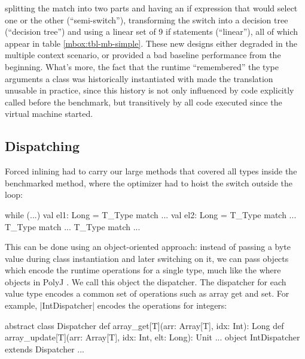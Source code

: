  splitting the match into two parts and having an if expression that would select one or the other (``semi-switch''), transforming the switch into a decision tree (``decision tree'') and using a linear set of 9 if statements (``linear''), all of which appear in table \ref{mbox:tbl-mb-simple}. These new designs either degraded in the multiple context scenario, or provided a bad baseline performance from the beginning. What's more, the fact that the runtime ``remembered'' the type arguments a class was historically instantiated with made the translation unusable in practice, since this history is not only influenced by code explicitly called before the benchmark, but transitively by all code executed since the virtual machine started. %

\subsection{Dispatching}
\label{mbox:subsec-mb-dispatching}

 Forced inlining had to carry our large methods that covered all types inside the benchmarked method, where the optimizer had to hoist the switch outside the loop:

\begin{lstlisting-nobreak}
 while (...) {
   val el1: Long = T_Type match { ... }
   val el2: Long = T_Type match { ... }
   T_Type match { ... }
   T_Type match { ... }
 }
\end{lstlisting-nobreak}

 This can be done using an object-oriented approach: instead of passing a byte value during class instantiation and later switching on it, we can pass objects which encode the runtime operations for a single type, much like the where objects in PolyJ \cite{myers-polyj}. We call this object the dispatcher. The dispatcher for each value type encodes a common set of operations such as array get and set. For example, |IntDispatcher| encodes the operations for integers:

\begin{lstlisting-nobreak}
 abstract class Dispatcher {
   def array_get[T](arr: Array[T], idx: Int): Long
   def array_update[T](arr: Array[T], idx: Int, elt: Long): Unit
   ...
 } 
 object IntDispatcher extends Dispatcher { ... }
\end{lstlisting-nobreak}


